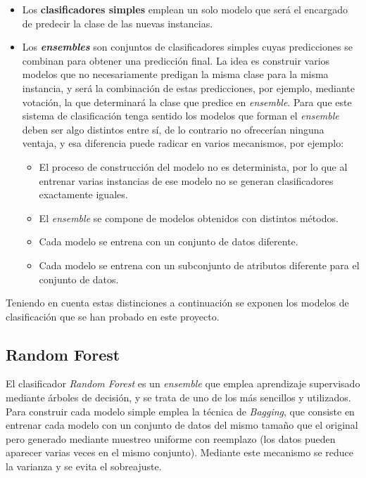 \begin{itemize}
	\item Los \textbf{clasificadores simples} emplean un solo modelo que será el encargado de predecir la clase de las nuevas instancias. 
	\item Los \textbf{\textit{ensembles}} son conjuntos de clasificadores simples cuyas predicciones se combinan para obtener una predicción final. La idea es construir varios modelos que no necesariamente predigan la misma clase para la misma instancia, y será la combinación de estas predicciones, por ejemplo, mediante votación, la que determinará la clase que predice en \textit{ensemble}. Para que este sistema de clasificación tenga sentido los modelos que forman el \textit{ensemble} deben ser algo distintos entre sí, de lo contrario no ofrecerían ninguna ventaja, y esa diferencia puede radicar en varios mecanismos, por ejemplo: 
	\begin{itemize}
		\item El proceso de construcción del modelo no es determinista, por lo que al entrenar varias instancias de ese modelo no se generan clasificadores exactamente iguales. 
		\item El \textit{ensemble} se compone de modelos obtenidos con distintos métodos. 
		\item Cada modelo se entrena con un conjunto de datos diferente.
		\item Cada modelo se entrena con un subconjunto de atributos diferente para el conjunto de datos. 
	\end{itemize} 
\end{itemize} 

Teniendo en cuenta estas distinciones a continuación se exponen los modelos de clasificación que se han probado en este proyecto.

\subsection{Random Forest}

El clasificador \textit{Random Forest} es un \textit{ensemble} que emplea aprendizaje supervisado mediante árboles de decisión, y se trata de uno de los más sencillos y utilizados. Para construir cada modelo simple emplea la técnica de \textit{Bagging}, que consiste en entrenar cada modelo con un conjunto de datos del mismo tamaño que el original pero generado mediante muestreo uniforme con reemplazo (los datos pueden aparecer varias veces en el mismo conjunto). Mediante este mecanismo se reduce la varianza y se evita el sobreajuste. 

